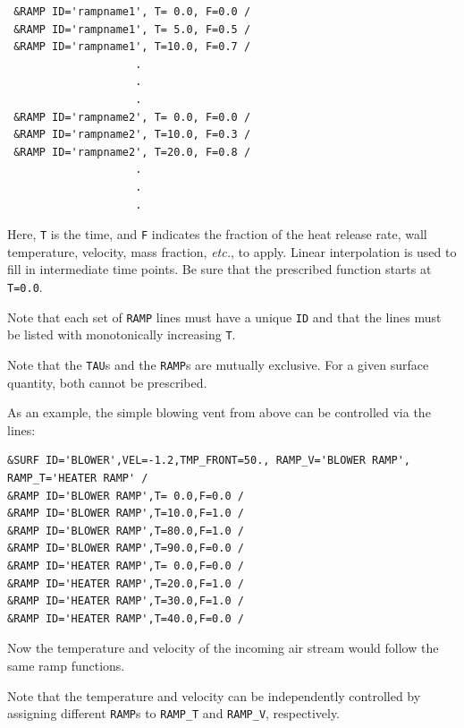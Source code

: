 \documentclass[11pt]{book}
\newcommand{\ct}{\tt\small}
\begin{document}
\footnotesize
\begin{verbatim}
 &RAMP ID='rampname1', T= 0.0, F=0.0 /
 &RAMP ID='rampname1', T= 5.0, F=0.5 /
 &RAMP ID='rampname1', T=10.0, F=0.7 /
                    .
                    .
                    .
 &RAMP ID='rampname2', T= 0.0, F=0.0 /
 &RAMP ID='rampname2', T=10.0, F=0.3 /
 &RAMP ID='rampname2', T=20.0, F=0.8 /
                    .
                    .
                    .
\end{verbatim}
\normalsize

\noindent

Here, {\ct T} is the time, and {\ct F} indicates the fraction of the heat
release rate, wall temperature, velocity, mass fraction, {\em etc.}, to apply.
Linear interpolation is used to fill in intermediate time points.
Be sure that the prescribed function starts at {\ct T=0.0}.

\begin{warning}
\noindent
Note that each set of {\ct RAMP} lines must have a unique {\ct ID} and that the lines must
be listed with monotonically increasing {\ct T}.
\end{warning}

\begin{warning}
\noindent
Note that the {\ct TAU}s and the {\ct RAMP}s are mutually exclusive. For a given
surface quantity, both cannot be prescribed.
\end{warning}

As an example, the simple blowing vent from above can be controlled via the lines:

\footnotesize
\begin{verbatim}
&SURF ID='BLOWER',VEL=-1.2,TMP_FRONT=50., RAMP_V='BLOWER RAMP', RAMP_T='HEATER RAMP' /
&RAMP ID='BLOWER RAMP',T= 0.0,F=0.0 /
&RAMP ID='BLOWER RAMP',T=10.0,F=1.0 /
&RAMP ID='BLOWER RAMP',T=80.0,F=1.0 /
&RAMP ID='BLOWER RAMP',T=90.0,F=0.0 /
&RAMP ID='HEATER RAMP',T= 0.0,F=0.0 /
&RAMP ID='HEATER RAMP',T=20.0,F=1.0 /
&RAMP ID='HEATER RAMP',T=30.0,F=1.0 /
&RAMP ID='HEATER RAMP',T=40.0,F=0.0 /
\end{verbatim}
\normalsize

\noindent
Now the temperature and velocity of the incoming air stream would
follow the same ramp functions.

\begin{warning}
\noindent
Note that the temperature and
velocity can be independently controlled by assigning different
{\ct RAMP}s to {\ct RAMP\_T} and {\ct RAMP\_V}, respectively.
\end{warning}
\end{document}
